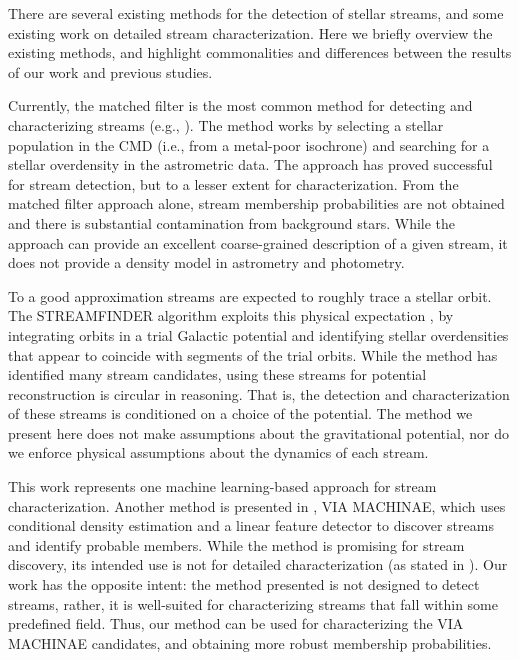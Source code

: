 \documentclass[twocolumn]{aastex631}
\begin{document}
        There are several existing methods for the detection of stellar streams,
        and some existing work on detailed stream characterization. Here we
        briefly overview the existing methods, and highlight commonalities and
        differences between the results of our work and previous studies. 

        Currently, the matched filter is the most common method for detecting
        and characterizing streams (e.g., \citealt{Rockosi+2002, Grillmair2014,
        Bonaca+2012, Jethwa+2018, Shipp+2018}).  The method works by selecting a
        stellar population in the CMD (i.e., from a metal-poor isochrone) and
        searching for a stellar overdensity in the astrometric data. The
        approach has proved successful for stream detection, but to a lesser
        extent for characterization. From the matched filter approach alone,
        stream membership probabilities are not obtained and there is
        substantial contamination from background stars. While the approach can
        provide an excellent coarse-grained description of a given stream, it
        does not provide a density model in astrometry and photometry. 

        To a good approximation streams are expected to roughly trace a stellar
        orbit. The STREAMFINDER algorithm exploits this physical expectation
        \citep{STREAMFINDER}, by integrating orbits in a trial Galactic
        potential and identifying stellar overdensities that appear to coincide
        with segments of the trial orbits. While the method has identified many
        stream candidates, using these streams for potential reconstruction is
        circular in reasoning. That is, the detection and characterization of
        these streams is conditioned on a choice of the potential. The method we
        present here does not make assumptions about the gravitational
        potential, nor do we enforce physical assumptions about the dynamics of
        each stream. 

        This work represents one machine learning-based approach for stream
        characterization. Another method is presented in \citet{Shih+2022}, VIA
        MACHINAE, which uses conditional density estimation and a linear feature
        detector to discover streams and identify probable members. While the
        method is promising for stream discovery, its intended use is not for
        detailed characterization (as stated in \citealt{Shih+2022}). Our work
        has the opposite intent: the method presented is not designed to detect
        streams, rather, it is well-suited for characterizing streams that fall
        within some predefined field. Thus, our method can be used for
        characterizing the VIA MACHINAE candidates, and obtaining more robust
        membership probabilities. 
\end{document}
